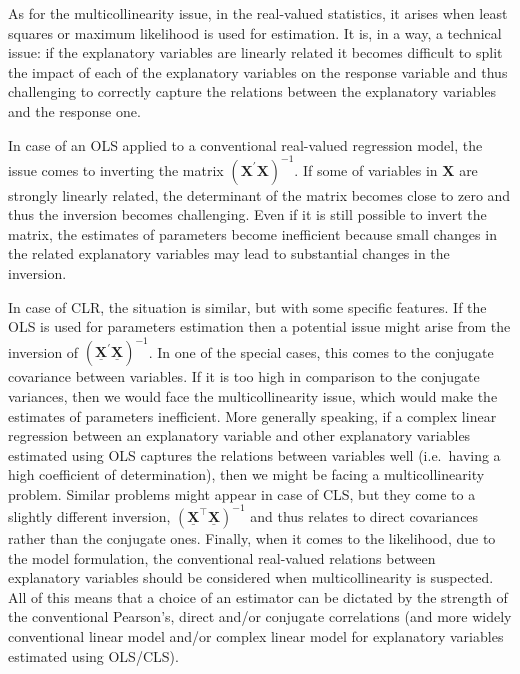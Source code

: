 \documentclass[
]{book}
\begin{document}
As for the multicollinearity issue, in the real-valued statistics, it arises when least squares or maximum likelihood is used for estimation. It is, in a way, a technical issue: if the explanatory variables are linearly related it becomes difficult to split the impact of each of the explanatory variables on the response variable and thus challenging to correctly capture the relations between the explanatory variables and the response one.

In case of an OLS applied to a conventional real-valued regression model, the issue comes to inverting the matrix \(\left( {\mathbf{X}}^\prime {\mathbf{X}} \right)^{-1}\). If some of variables in \(\mathbf{X}\) are strongly linearly related, the determinant of the matrix becomes close to zero and thus the inversion becomes challenging. Even if it is still possible to invert the matrix, the estimates of parameters become inefficient because small changes in the related explanatory variables may lead to substantial changes in the inversion.

In case of CLR, the situation is similar, but with some specific features. If the OLS is used for parameters estimation then a potential issue might arise from the inversion of \(\left( \underline{\mathbf{X}}^\prime \underline{\mathbf{X}}\right)^{-1}\). In one of the special cases, this comes to the conjugate covariance between variables. If it is too high in comparison to the conjugate variances, then we would face the multicollinearity issue, which would make the estimates of parameters inefficient. More generally speaking, if a complex linear regression between an explanatory variable and other explanatory variables estimated using OLS captures the relations between variables well (i.e.~having a high coefficient of determination), then we might be facing a multicollinearity problem. Similar problems might appear in case of CLS, but they come to a slightly different inversion, \(\left( \underline{\mathbf{X}}^\top \underline{\mathbf{X}}\right)^{-1}\) and thus relates to direct covariances rather than the conjugate ones. Finally, when it comes to the likelihood, due to the model formulation, the conventional real-valued relations between explanatory variables should be considered when multicollinearity is suspected. All of this means that a choice of an estimator can be dictated by the strength of the conventional Pearson's, direct and/or conjugate correlations (and more widely conventional linear model and/or complex linear model for explanatory variables estimated using OLS/CLS).
\end{document}
